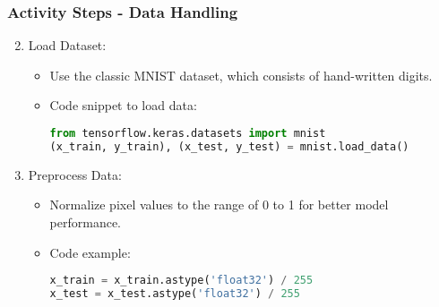 \documentclass[aspectratio=169]{beamer}
\begin{document}
\begin{frame}[fragile]
    \frametitle{Activity Steps - Data Handling}
    \begin{enumerate}
        \setcounter{enumi}{1}
        \item Load Dataset:
        \begin{itemize}
            \item Use the classic MNIST dataset, which consists of hand-written digits.
            \item Code snippet to load data:
            \begin{lstlisting}[language=python]
from tensorflow.keras.datasets import mnist
(x_train, y_train), (x_test, y_test) = mnist.load_data()
            \end{lstlisting}
        \end{itemize}
        
        \item Preprocess Data:
        \begin{itemize}
            \item Normalize pixel values to the range of 0 to 1 for better model performance.
            \item Code example:
            \begin{lstlisting}[language=python]
x_train = x_train.astype('float32') / 255
x_test = x_test.astype('float32') / 255
            \end{lstlisting}
        \end{itemize}
    \end{enumerate}
\end{frame}
\end{document}
